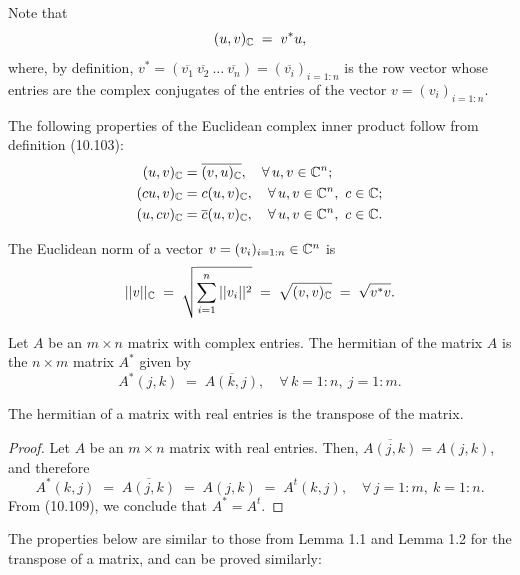 Note that
\begin{equation}
(u,v)_{\mathbb{C}} \;=\; v^*u,
\end{equation}
where, by definition, $v^* = (\overline{v_1} \ \overline{v_2} \ \ldots \
\overline{v_n}) = (\overline{v_i})_{i=1:n}$ is the row vector whose entries are the
complex conjugates of the entries of the vector $v = (v_i)_{i=1:n}$.

The following properties of the Euclidean complex inner product follow from
definition (10.103):
\begin{align}
(u,v)_{\mathbb{C}} &= \overline{(v,u)_{\mathbb{C}}}, \quad \forall\, u,v \in \mathbb{C}^n; \\
(cu,v)_{\mathbb{C}} &= c(u,v)_{\mathbb{C}}, \quad \forall\, u,v \in \mathbb{C}^n,\ c \in \mathbb{C}; \\
(u,cv)_{\mathbb{C}} &= \overline{c}(u,v)_{\mathbb{C}}, \quad \forall\, u,v \in \mathbb{C}^n,\ c \in \mathbb{C}.
\end{align}

\begin{definition}
The Euclidean norm of a vector $v = (v_i)_{i=1:n} \in \mathbb{C}^n$ is
\begin{equation}
||v||_{\mathbb{C}} \;=\; \sqrt{\sum_{i=1}^n ||v_i||^2} \;=\; \sqrt{(v,v)_{\mathbb{C}}} \;=\;
\sqrt{v^*v}.
\end{equation}
\end{definition}

\begin{definition}
Let $A$ be an $m \times n$ matrix with complex entries. The hermitian of the matrix
$A$ is the $n \times m$ matrix $A^*$ given by
\[
A^*(j,k) \;=\; \overline{A(k,j)}, \quad \forall\, k = 1:n,\ j = 1:m.
\]
\end{definition}

\begin{lemma}
The hermitian of a matrix with real entries is the transpose of the matrix.
\end{lemma}

\begin{proof}
Let $A$ be an $m \times n$ matrix with real entries. Then, $\overline{A(j,k)} =
A(j,k)$, and therefore
\begin{equation}
A^*(k,j) \;=\; \overline{A(j,k)} \;=\; A(j,k) \;=\; A^t(k,j), \quad \forall\, j =
1:m,\ k = 1:n.
\end{equation}
From (10.109), we conclude that $A^* = A^t$.
\end{proof}

The properties below are similar to those from Lemma 1.1 and Lemma 1.2 for the
transpose of a matrix, and can be proved similarly:

